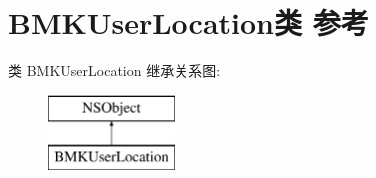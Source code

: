 \hypertarget{interface_b_m_k_user_location}{}\section{B\+M\+K\+User\+Location类 参考}
\label{interface_b_m_k_user_location}
类 B\+M\+K\+User\+Location 继承关系图\+:\begin{figure}[H]
\begin{center}
\leavevmode
\includegraphics[height=2.000000cm]{interface_b_m_k_user_location}
\end{center}
\end{figure}
